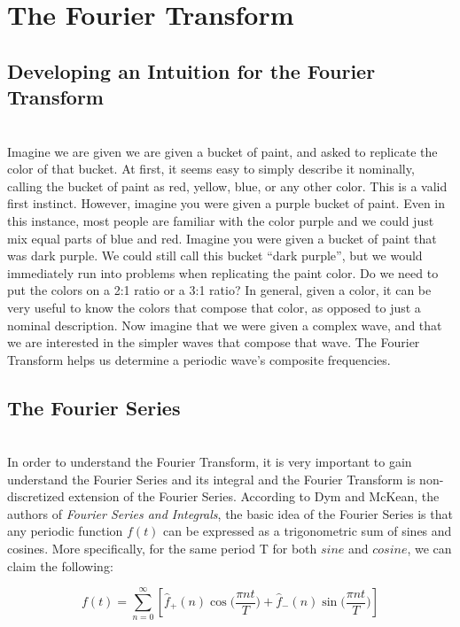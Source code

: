 \documentclass{amsproc}
\begin{document}
\section{The Fourier Transform}

\subsection{Developing an Intuition for the Fourier Transform}

\mbox{}	\\
\indent Imagine we are given we are given a bucket of paint, and asked to replicate the color of that bucket. At first, it seems easy to simply describe it nominally, calling the bucket of paint as red, yellow, blue, or any other color.  This is a valid first instinct. However, imagine you were given a purple bucket of paint. Even in this instance, most people are familiar with the color purple and we could just mix equal parts of blue and red. Imagine you were given a bucket of paint that was dark purple. We could still call this bucket “dark purple”, but we would immediately run into problems when replicating the paint color. Do we need to put the colors on a 2:1 ratio or a 3:1 ratio? In general, given a color, it can be very useful to know the colors that compose that color, as opposed to just a nominal description. Now imagine that we were given a complex wave, and that we are interested in the simpler waves that compose that wave. The Fourier Transform helps us determine a periodic wave's composite frequencies.

\subsection{The Fourier Series}

\mbox{}	\\
\indent In order to understand the Fourier Transform, it is very important to gain understand the Fourier Series and its integral and the Fourier Transform is non-discretized extension of the Fourier Series. According to Dym and McKean, the authors of \textit{Fourier Series and Integrals}, the basic idea of the Fourier Series is that any periodic function $f(t)$ can be expressed as a trigonometric sum of sines and cosines. More specifically, for the same period T for both $sine$ and $cosine$, we can claim the following:

$$
f(t) = \sum_{n = 0}^{\infty} [\hat f_+(n)\cos \Big(\frac{\pi n t}{T}\Big) + \hat f_-(n)\sin \Big(\frac{\pi n t}{T}\Big)]
$$
\end{document}
